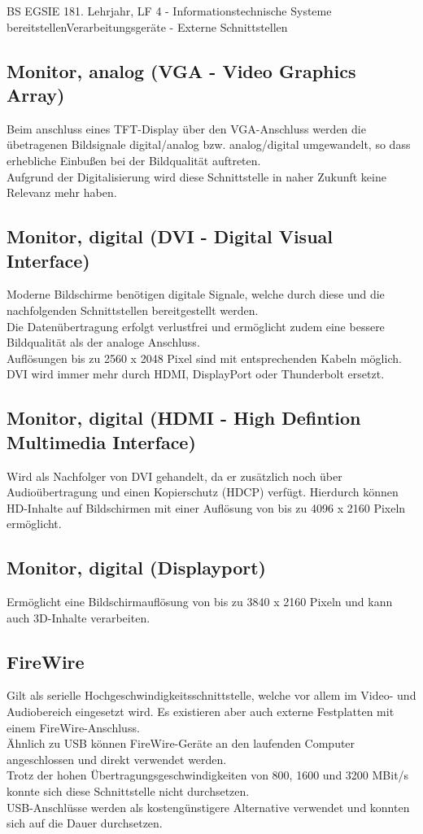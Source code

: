 \documentclass[11pt,oneside,twocolumn,openany,headings=optiontotoc,11pt,numbers=noenddot]{article}
\begin{document}
\begin{worksheet}{BS EGSIE 18}{1. Lehrjahr, LF 4 - Informationstechnische Systeme bereitstellen}{Verarbeitungsgeräte - Externe Schnittstellen}
		\subsection*{Monitor, analog (VGA - Video Graphics Array)}
		Beim anschluss eines TFT-Display über den VGA-Anschluss werden die übetragenen Bildsignale digital/analog bzw. analog/digital umgewandelt, so dass erhebliche Einbußen bei der Bildqualität auftreten.\\
		\footnotesize{Aufgrund der Digitalisierung wird diese Schnittstelle in naher Zukunft keine Relevanz mehr haben.}\normalsize
		\subsection*{Monitor, digital (DVI - Digital Visual Interface)}
		Moderne Bildschirme benötigen digitale Signale, welche durch diese und die nachfolgenden Schnittstellen bereitgestellt werden.\\
		Die Datenübertragung erfolgt verlustfrei und ermöglicht zudem eine bessere Bildqualität als der analoge Anschluss.\\
		Auflösungen bis zu 2560 x 2048 Pixel sind mit entsprechenden Kabeln möglich.\\
		\footnotesize{DVI wird immer mehr durch HDMI, DisplayPort oder Thunderbolt ersetzt.}\normalsize
		\subsection*{Monitor, digital (HDMI - High Defintion Multimedia Interface)}
		Wird als Nachfolger von DVI gehandelt, da er zusätzlich noch über Audioübertragung und einen Kopierschutz (HDCP) verfügt. Hierdurch können HD-Inhalte auf Bildschirmen mit einer Auflösung von bis zu 4096 x 2160 Pixeln ermöglicht.
		\subsection*{Monitor, digital (Displayport)}
		Ermöglicht eine Bildschirmauflösung von bis zu 3840 x 2160 Pixeln und kann auch 3D-Inhalte verarbeiten.
		\subsection*{FireWire}
		Gilt als serielle Hochgeschwindigkeitsschnittstelle, welche vor allem im Video- und Audiobereich eingesetzt wird. Es existieren aber auch externe Festplatten mit einem FireWire-Anschluss.\\
		Ähnlich zu USB können FireWire-Geräte an den laufenden Computer angeschlossen und direkt verwendet werden.\\
		Trotz der hohen Übertragungsgeschwindigkeiten von 800, 1600 und 3200 MBit/s konnte sich diese Schnittstelle nicht durchsetzen.\\
		\footnotesize{USB-Anschlüsse werden als kostengünstigere Alternative verwendet und konnten sich auf die Dauer durchsetzen.}

\end{worksheet}
\end{document}
